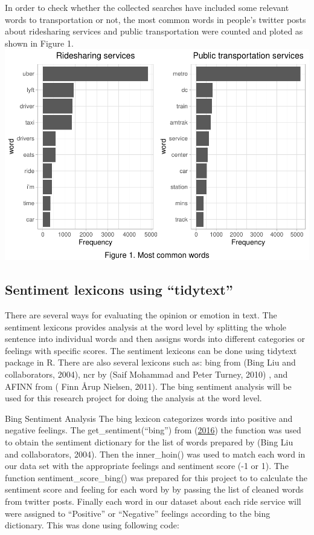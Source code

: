 \documentclass[
  12pt,
]{article}
\begin{document}
In order to check whether the collected searches have included some
relevant words to transportation or not, the most common words in
people's twitter posts about ridesharing services and public
transportation were counted and ploted as shown in Figure 1.
\includegraphics{Class_Project_Report_files/figure-latex/unnamed-chunk-11-1.pdf}

\hypertarget{sentiment-lexicons-using-tidytext}{%
\subsection{Sentiment lexicons using
``tidytext''}\label{sentiment-lexicons-using-tidytext}}

There are several ways for evaluating the opinion or emotion in text.
The sentiment lexicons provides analysis at the word level by splitting
the whole sentence into individual words and then assigns words into
different categories or feelings with specific scores. The sentiment
lexicons can be done using tidytext package in R. There are also several
lexicons such as: bing from (Bing Liu and collaborators, 2004), ncr by
(Saif Mohammad and Peter Turney, 2010) , and AFINN from ( Finn Årup
Nielsen, 2011). The bing sentiment analysis will be used for this
research project for doing the analysis at the word level.

Bing Sentiment Analysis The bing lexicon categorizes words into positive
and negative feelings. The get\_sentiment(``bing'') from
(\protect\hyperlink{ref-tidytext}{2016}) the function was used to obtain
the sentiment dictionary for the list of words prepared by (Bing Liu and
collaborators, 2004). Then the inner\_hoin() was used to match each word
in our data set with the appropriate feelings and sentiment score (-1 or
1). The function sentiment\_score\_bing() was prepared for this project
to to calculate the sentiment score and feeling for each word by by
passing the list of cleaned words from twitter posts. Finally each word
in our dataset about each ride service will were assigned to
``Positive'' or ``Negative'' feelings according to the bing dictionary.
This was done using following code:
\end{document}
